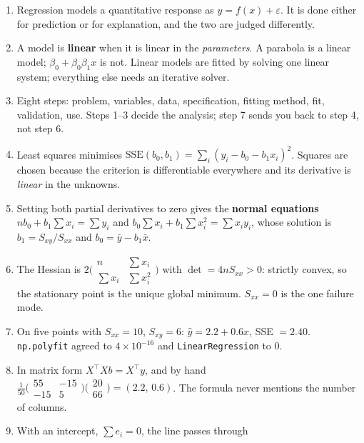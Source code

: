 \documentclass[11pt]{article}
\begin{document}
\begin{enumerate}[leftmargin=*]
  \item Regression models a quantitative response as $y = f(x)+\varepsilon$.
    It is done either for prediction or for explanation, and the two are
    judged differently.
  \item A model is \textbf{linear} when it is linear in the \emph{parameters}.
    A parabola is a linear model; $\beta_0 + \beta_0\beta_1x$ is not. Linear
    models are fitted by solving one linear system; everything else needs an
    iterative solver.
  \item Eight steps: problem, variables, data, specification, fitting method,
    fit, validation, use. Steps 1--3 decide the analysis; step 7 sends you
    back to step 4, not step 6.
  \item Least squares minimises
    $\mathrm{SSE}(b_0,b_1)=\sum_i(y_i-b_0-b_1x_i)^2$. Squares are chosen
    because the criterion is differentiable everywhere and its derivative is
    \emph{linear} in the unknowns.
  \item Setting both partial derivatives to zero gives the \textbf{normal
    equations} $nb_0 + b_1\sum x_i = \sum y_i$ and
    $b_0\sum x_i + b_1\sum x_i^2 = \sum x_iy_i$, whose solution is
    $b_1 = S_{xy}/S_{xx}$ and $b_0 = \bar y - b_1\bar x$.
  \item The Hessian is $2\bigl(\begin{smallmatrix} n & \sum x_i\\
    \sum x_i & \sum x_i^2\end{smallmatrix}\bigr)$ with $\det = 4nS_{xx}>0$:
    strictly convex, so the stationary point is the unique global minimum.
    $S_{xx}=0$ is the one failure mode.
  \item On five points with $S_{xx}=10$, $S_{xy}=6$: $\hat y = 2.2 + 0.6x$,
    SSE $=2.40$. \texttt{np.polyfit} agreed to $4\times10^{-16}$ and
    \texttt{LinearRegression} to $0$.
  \item In matrix form $X^{\!\top}\!Xb = X^{\!\top}y$, and by hand
    $\frac{1}{50}\bigl(\begin{smallmatrix}55&-15\\-15&5\end{smallmatrix}\bigr)
    \bigl(\begin{smallmatrix}20\\66\end{smallmatrix}\bigr) = (2.2,\,0.6)$.
    The formula never mentions the number of columns.
  \item With an intercept, $\sum e_i = 0$, the line passes through

\end{enumerate}
\end{document}
